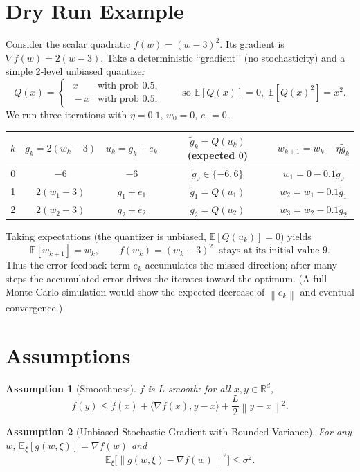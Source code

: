 \documentclass{article}
\newcommand{\E}{\mathbb{E}}
\newcommand{\R}{\mathbb{R}}
\newcommand{\norm}[1]{\left\|#1\right\|}
\newtheorem{assumption}{Assumption}
\begin{document}
\section*{Dry Run Example}
Consider the scalar quadratic $f(w)=(w-3)^2$.  
Its gradient is $\nabla f(w)=2(w-3)$.  
Take a deterministic “gradient’’ (no stochasticity) and a simple 2‑level unbiased quantizer
\[
Q(x)=\begin{cases}
\;x &\text{with prob }0.5,\\
\; -x &\text{with prob }0.5,
\end{cases}
\qquad\text{so }\E[Q(x)]=0,\;\E[Q(x)^2]=x^2 .
\]
We run three iterations with $\eta=0.1$, $w_0=0$, $e_0=0$.

\begin{center}
\begin{tabular}{c|c|c|c|c}
$k$ & $g_k=2(w_k-3)$ & $u_k=g_k+e_k$ & $\tilde g_k=Q(u_k)$ (expected $0$) & $w_{k+1}=w_k-\eta\tilde g_k$\\\hline
0 & $-6$ & $-6$ & $\tilde g_0\in\{-6,6\}$ & $w_1 = 0-0.1\tilde g_0$\\
1 & $2(w_1-3)$ & $g_1+e_1$ & $\tilde g_1=Q(u_1)$ & $w_2 = w_1-0.1\tilde g_1$\\
2 & $2(w_2-3)$ & $g_2+e_2$ & $\tilde g_2=Q(u_2)$ & $w_3 = w_2-0.1\tilde g_2$
\end{tabular}
\end{center}
Taking expectations (the quantizer is unbiased, $\E[Q(u_k)]=0$) yields
\[
\E[w_{k+1}]=w_k,\qquad
f(w_{k})=(w_k-3)^2\;\text{ stays at its initial value }9.
\]
Thus the error‑feedback term $e_k$ accumulates the missed direction; after many steps the accumulated error drives the iterates toward the optimum. (A full Monte‑Carlo simulation would show the expected decrease of $\norm{e_k}$ and eventual convergence.)

\newpage
\section*{Assumptions}
\begin{assumption}[Smoothness]\label{ass:smooth}
$f$ is $L$‑smooth: for all $x,y\in\R^{d}$,
\[
f(y)\le f(x)+\langle\nabla f(x),y-x\rangle+\frac{L}{2}\norm{y-x}^2 .
\]
\end{assumption}

\begin{assumption}[Unbiased Stochastic Gradient with Bounded Variance]\label{ass:sg}
For any $w$, $\E_{\xi}[g(w,\xi)]=\nabla f(w)$ and
\[
\E_{\xi}\!\big[\norm{g(w,\xi)-\nabla f(w)}^2\big]\le\sigma^2 .
\]
\end{assumption}
\end{document}
